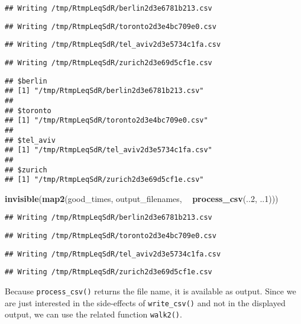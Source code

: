 \documentclass[]{book}
\newenvironment{Shaded}{\begin{snugshade}}{\end{snugshade}}
\newcommand{\DecValTok}[1]{\textcolor[rgb]{0.00,0.00,0.81}{#1}}
\newcommand{\KeywordTok}[1]{\textcolor[rgb]{0.13,0.29,0.53}{\textbf{#1}}}
\newcommand{\NormalTok}[1]{#1}
\newcommand{\OperatorTok}[1]{\textcolor[rgb]{0.81,0.36,0.00}{\textbf{#1}}}
\newcommand{\StringTok}[1]{\textcolor[rgb]{0.31,0.60,0.02}{#1}}
\begin{document}
\begin{verbatim}
## Writing /tmp/RtmpLeqSdR/berlin2d3e6781b213.csv
\end{verbatim}

\begin{verbatim}
## Writing /tmp/RtmpLeqSdR/toronto2d3e4bc709e0.csv
\end{verbatim}

\begin{verbatim}
## Writing /tmp/RtmpLeqSdR/tel_aviv2d3e5734c1fa.csv
\end{verbatim}

\begin{verbatim}
## Writing /tmp/RtmpLeqSdR/zurich2d3e69d5cf1e.csv
\end{verbatim}

\begin{verbatim}
## $berlin
## [1] "/tmp/RtmpLeqSdR/berlin2d3e6781b213.csv"
## 
## $toronto
## [1] "/tmp/RtmpLeqSdR/toronto2d3e4bc709e0.csv"
## 
## $tel_aviv
## [1] "/tmp/RtmpLeqSdR/tel_aviv2d3e5734c1fa.csv"
## 
## $zurich
## [1] "/tmp/RtmpLeqSdR/zurich2d3e69d5cf1e.csv"
\end{verbatim}

\begin{Shaded}
\begin{Highlighting}[]
\KeywordTok{invisible}\NormalTok{(}\KeywordTok{map2}\NormalTok{(good_times, output_filenames, }\OperatorTok{~}\StringTok{ }\KeywordTok{process_csv}\NormalTok{(..}\DecValTok{2}\NormalTok{, ..}\DecValTok{1}\NormalTok{)))}
\end{Highlighting}
\end{Shaded}

\begin{verbatim}
## Writing /tmp/RtmpLeqSdR/berlin2d3e6781b213.csv
\end{verbatim}

\begin{verbatim}
## Writing /tmp/RtmpLeqSdR/toronto2d3e4bc709e0.csv
\end{verbatim}

\begin{verbatim}
## Writing /tmp/RtmpLeqSdR/tel_aviv2d3e5734c1fa.csv
\end{verbatim}

\begin{verbatim}
## Writing /tmp/RtmpLeqSdR/zurich2d3e69d5cf1e.csv
\end{verbatim}

Because \texttt{process\_csv()} returns the file name, it is available as output.
Since we are just interested in the side-effects of \texttt{write\_csv()} and not in the displayed output, we can use the related function \texttt{walk2()}.
\end{document}
